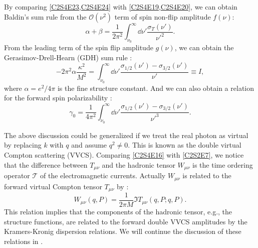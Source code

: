 By comparing \cref{C2S4E23,C2S4E24} with \cref{C2S4E19,C2S4E20}, we can obtain Baldin's sum rule \cite{Baldin1960,Lapidus1963} from the $\mathcal{O}(\nu^2)$ term of spin non-flip amplitude $f(\nu)$:
\begin{equation} \label{C2S4E25}
\alpha+\beta = \frac{1}{2\pi^2}\int_{\nu_0}^\infty\dd{\nu'}\frac{\sigma_T(\nu')}{\nu'^{2}}.
\end{equation}
From the leading term of the spin flip amplitude $g(\nu)$, we can obtain the Gerasimov-Drell-Hearn (GDH) sum rule \cite{Gerasimov1966,Drell1966}:
\begin{equation} \label{C2S4E26}
-2\pi^2\alpha\frac{\kappa^2}{M^2} = \int_{\nu_0}^\infty\dd{\nu'}\frac{\sigma_{1/2}(\nu')-\sigma_{3/2}(\nu')}{\nu'}\equiv I,
\end{equation}
where $\alpha=e^2/4\pi$ is the fine structure constant. And we can also obtain a relation for the forward spin polarizability \cite{Gellmann1954a,Gellmann1954b}:
\begin{equation} \label{C2S4E27}
\gamma_0 = \frac{1}{4\pi^2}\int_{\nu_0}^\infty\dd{\nu'}\frac{\sigma_{1/2}(\nu')-\sigma_{3/2}(\nu')}{\nu'^3}.
\end{equation}

The above discussion could be generalized if we treat the real photon as virtual by replacing $k$ with $q$ and assume $q^2\neq 0$. This is known as the double virtual Compton scattering (VVCS). Comparing \cref{C2S4E16} with \cref{C2S2E7}, we notice that the difference between $T_{\mu\nu}$ and the hadronic tensor $W_{\mu\nu}$ is the time ordering operator $\mathcal{T}$ of the electromagnetic currents. Actually $W_{\mu\nu}$ is related to the forward virtual Compton tensor $T_{\mu\nu}$ by \cite{Thomas2001}:
\begin{equation} \label{C2S4E190}
W_{\mu\nu}(q,P) = \frac{1}{2\pi M}\Im T_{\mu\nu}(q,P;q,P).
\end{equation}
This relation implies that the components of the hadronic tensor, e.g., the structure functions, are related to the forward double VVCS amplitudes by the Kramers-Kronig dispersion relations. We will continue the discussion of these relations in .

